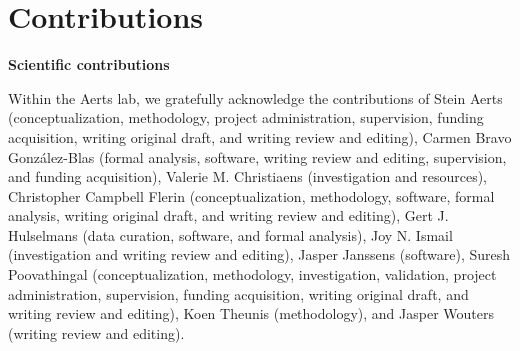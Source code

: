 \chapter*{Contributions}

\vspace{1em}
\noindent\textbf{\Large Scientific contributions}\par
\vspace{0.5em}

Within the Aerts lab, we gratefully acknowledge the contributions of
Stein Aerts (conceptualization, methodology, project administration, supervision, funding acquisition, writing original draft, and writing review and editing),
Carmen Bravo González-Blas (formal analysis, software, writing review and editing, supervision, and funding acquisition),
Valerie M. Christiaens (investigation and resources),
Christopher Campbell Flerin (conceptualization, methodology, software, formal analysis, writing original draft, and writing review and editing),
Gert J. Hulselmans (data curation, software, and formal analysis),
Joy N. Ismail (investigation and writing review and editing),
Jasper Janssens (software),
Suresh Poovathingal (conceptualization, methodology, investigation, validation, project administration, supervision, funding acquisition, writing original draft, and writing review and editing),
Koen Theunis (methodology),
and Jasper Wouters (writing review and editing).

